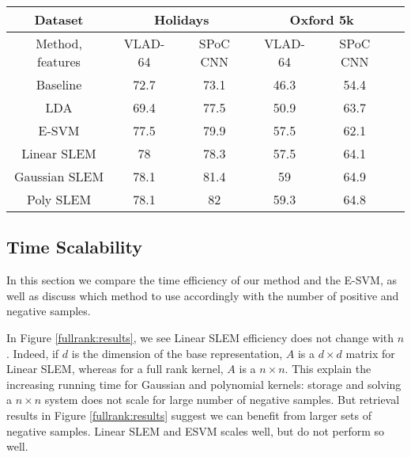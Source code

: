 \begin{table*}[t]
\begin{center}
\begin{tabular}{|c|c|c|c|c|c|}
\hline
Dataset & \multicolumn{2}{|c|}{\textbf{Holidays}} & \multicolumn{2}{|c|}{\textbf{Oxford 5k}}\\
\hline
Method, features & VLAD-64 \cite{VLAD} & SPoC CNN \cite{babenko15} & VLAD-64 & SPoC CNN \\
\hline\hline
Baseline            & 72.7  & 73.1 & 46.3 & 54.4\\
LDA                 & 69.4 & 77.5 & 50.9  & 63.7\\
E-SVM               & 77.5 & 79.9 & 57.5  & 62.1\\
Linear SLEM         & 78   & 78.3 & 57.5  & 64.1\\
Gaussian SLEM       & 78.1 & 81.4 & 59    & 64.9\\
Poly SLEM           & 78.1 &  82  & 59.3  & 64.8\\
\hline
\end{tabular}
\end{center}
\caption{Mean average precision results for INRIA Holidays and Oxford buildings datasets, expressed as percentages.}
\label{fullrank:results}
\end{table*}

\subsection{Time Scalability} \label{time-scale}
In this section we compare the time efficiency of our method and the E-SVM, as well as discuss which method to use accordingly with the number of positive and negative samples.

In Figure \ref{fullrank:results}, we see Linear SLEM efficiency does not change with $n$. 
Indeed, if $d$ is the dimension of the base representation, $A$ is a $d\times d$ matrix for Linear SLEM, whereas for a full rank kernel, $A$ is a $n\times n$. 
This explain the increasing running time for Gaussian and polynomial kernels: storage and solving a $n\times n$ system does not scale for large number of negative samples. 
But retrieval results in Figure \ref{fullrank:results} suggest we can benefit from larger sets of negative samples. Linear SLEM and ESVM scales well, but do not perform so well. 
\vspace{3 mm}


